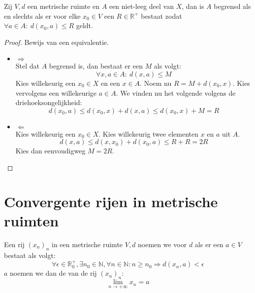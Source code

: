 \documentclass[main.tex]{subfiles}
\begin{document}
\begin{bpr}
  Zij $V,d$ een metrische ruimte en $A$ een niet-leeg deel van $X$, dan is $A$ begrensd als en slechts als er voor elke $x_{0}\in V$ een $R\in \mathbb{R}^{+}$ bestaat zodat $\forall a\in A:\ d(x_{0},a) \le R$ geldt.

  \begin{proof}
    Bewijs van een equivalentie.
    \begin{itemize}
    \item $\Rightarrow$\\
      Stel dat $A$ begrensd is, dan bestaat er een $M$ als volgt:
      \[ \forall x,a \in A:\ d(x,a) \le M \]
      Kies willekeurig een $x_{0}\in X$ en een $x\in A$.
      Noem nu $R=M + d(x_{0},x)$.
      Kies vervolgens een willekeurige $a\in A$.
      We vinden nu het volgende volgens de driehoeksongelijkheid:
      \[ d(x_{0},a) \le d(x_{0},x) + d(x,a) \le d(x_{0},x) + M = R \]
    \item $\Leftarrow$\\
      Kies willekeurig een $x_{0}\in X$.
      Kies willekeurig twee elementen $x$ en $a$ uit $A$.
      \[ d(x,a) \le d(x,x_{0}) + d(x_{0},a) \le R + R = 2R\]
      Kies dan eenvoudigweg $M=2R$.
    \end{itemize}
  \end{proof}
\end{bpr}

\section{Convergente rijen in metrische ruimten}
\label{sec:rijen-metr-ruimt}

\begin{de}
  Een rij $(x_{n})_{n}$ in een metrische ruimte $V,d$ noemen we  voor $d$ als er een $a\in V$ bestaat als volgt:
  \[ \forall \epsilon\in\mathbb{R}_{0}^{+}, \exists n_{0}\in \mathbb{N}, \forall n\in \mathbb{N}: n \ge n_{0} \Rightarrow d(x_{n},a) < \epsilon \]
  $a$ noemen we dan de  van de rij $(x_{n})_{n}$:
  \[ \lim_{n\rightarrow +\infty}x_{n} = a \]
\end{de}
\end{document}
